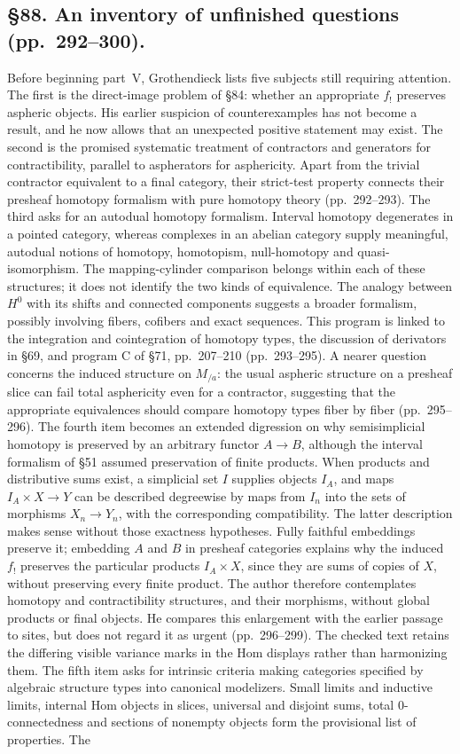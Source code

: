 \documentclass[10pt,oneside]{book}
\begin{document}
\subsection*{\S88. An inventory of unfinished questions (pp.\ 292--300).}
Before beginning part~V, Grothendieck lists five subjects still requiring attention. The first is the direct-image problem of \S84: whether an appropriate $f_!$ preserves aspheric objects. His earlier suspicion of counterexamples has not become a result, and he now allows that an unexpected positive statement may exist. The second is the promised systematic treatment of contractors and generators for contractibility, parallel to aspherators for asphericity. Apart from the trivial contractor equivalent to a final category, their strict-test property connects their presheaf homotopy formalism with pure homotopy theory (pp.\ 292--293). The third asks for an autodual homotopy formalism. Interval homotopy degenerates in a pointed category, whereas complexes in an abelian category supply meaningful, autodual notions of homotopy, homotopism, null-homotopy and quasi-isomorphism. The mapping-cylinder comparison belongs within each of these structures; it does not identify the two kinds of equivalence. The analogy between $H^0$ with its shifts and connected components suggests a broader formalism, possibly involving fibers, cofibers and exact sequences. This program is linked to the integration and cointegration of homotopy types, the discussion of derivators in \S69, and program C of \S71, pp.\ 207--210 (pp.\ 293--295). A nearer question concerns the induced structure on $M_{/a}$: the usual aspheric structure on a presheaf slice can fail total asphericity even for a contractor, suggesting that the appropriate equivalences should compare homotopy types fiber by fiber (pp.\ 295--296). The fourth item becomes an extended digression on why semisimplicial homotopy is preserved by an arbitrary functor $A\to B$, although the interval formalism of \S51 assumed preservation of finite products. When products and distributive sums exist, a simplicial set $I$ supplies objects $I_A$, and maps $I_A\times X\to Y$ can be described degreewise by maps from $I_n$ into the sets of morphisms $X_n\to Y_n$, with the corresponding compatibility. The latter description makes sense without those exactness hypotheses. Fully faithful embeddings preserve it; embedding $A$ and $B$ in presheaf categories explains why the induced $f_!$ preserves the particular products $I_A\times X$, since they are sums of copies of $X$, without preserving every finite product. The author therefore contemplates homotopy and contractibility structures, and their morphisms, without global products or final objects. He compares this enlargement with the earlier passage to sites, but does not regard it as urgent (pp.\ 296--299). The checked text retains the differing visible variance marks in the Hom displays rather than harmonizing them. The fifth item asks for intrinsic criteria making categories specified by algebraic structure types into canonical modelizers. Small limits and inductive limits, internal Hom objects in slices, universal and disjoint sums, total 0-connectedness and sections of nonempty objects form the provisional list of properties. The 
\end{document}
